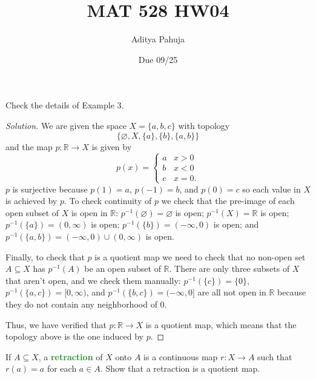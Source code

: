 \documentclass[10pt]{article}
\title{MAT 528 HW04}
\author{\large Aditya Pahuja}
\date{\large Due 09/25}
\providecommand{\RR}{\mathbb R}
\providecommand{\inv}{^{-1}}
\newenvironment{soln}{\begin{proof}[Solution]}{\end{proof}}
\providecommand{\vocab}[1]{{\textbf{\textcolor{ForestGreen}{#1}}}}
\begin{document}
\maketitle

\begin{problem}
    [Munkres 22.1]
    Check the details of Example 3.
\end{problem}

\begin{soln}
    We are given the space $X = \{a,b,c\}$ with topology
    \begin{equation*}
	\{\varnothing, X, \{a\}, \{b\}, \{a,b\}\}
    \end{equation*}
    and the map $p\colon\RR\to X$ is given by
    \begin{equation*}
        p(x) = \begin{cases}
	    a & x>0\\
	    b & x<0\\
	    c & x=0.
        \end{cases}
    \end{equation*}
    $p$ is surjective because $p(1) = a$, $p(-1) = b$, and $p(0) = c$
    so each value in $X$ is achieved by $p$.
    To check continuity of $p$ we check that the pre-image of
    each open subset of $X$ is open in $\RR$:
    $p\inv(\varnothing) = \varnothing$ is open;
    $p\inv(X) = \RR$ is open;
    $p\inv(\{a\}) = (0,\infty)$ is open;
    $p\inv(\{b\}) = (-\infty,0)$ is open; and
    $p\inv(\{a,b\}) = (-\infty,0)\cup(0,\infty)$ is open.

    Finally, to check that $p$ is a quotient map we need to check that
    no non-open set $A\subseteq X$ has $p\inv(A)$ be an open subset of $\RR$.
    There are only three subsets of $X$ that aren't open,
    and we check them manually:
    $p\inv(\{c\}) = \{0\}$, $p\inv(\{a,c\}) = [0,\infty)$,
    and $p\inv(\{b,c\}) = (-\infty,0]$ are all not open in $\RR$
    because they do not contain any neighborhood of $0$.

    Thus, we have verified that $p\colon\RR\to X$ is a quotient map,
    which means that the topology above is the one induced by $p$.
\end{soln}

\begin{problem}
    [Munkres 22.2b]
    If $A\subseteq X$, a \vocab{retraction} of $X$ onto $A$ is
    a continuous map $r\colon X\to A$ such that $r(a) = a$ for each $a\in A$.
    Show that a retraction is a quotient map.
\end{problem}
\end{document}
